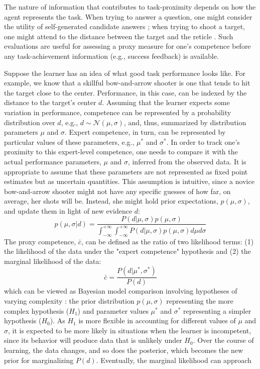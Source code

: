 The nature of information that contributes to task-proximity depends on how the agent represents the task. When trying to answer a question, one might consider the utility of self-generated candidate answers \cite{coenen_asking_2019}; when trying to shoot a target, one might attend to the distance between the target and the reticle \cite{locke_performance_2020}. Such evaluations are useful for assessing a proxy measure for one's competence before any task-achievement information (e.g., success feedback) is available.

Suppose the learner has an idea of what good task performance looks like. For example, we know that a skillful bow-and-arrow shooter is one that tends to hit the target close to the center. Performance, in this case, can be indexed by the distance to the target's center $d$. Assuming that the learner expects some variation in performance, competence can be represented by a probability distribution over $d$, e.g., $d \sim \mathcal{N}(\mu, \sigma)$, and, thus, summarized by distribution parameters $\mu$ and $\sigma$. Expert competence, in turn, can be represented by particular values of these parameters, e.g., $\mu^*$ and $\sigma^*$. In order to track one's proximity to this expert-level competence, one needs to compare it with the actual performance parameters, $\mu$ and $\sigma$, inferred from the observed data. It is appropriate to assume that these parameters are not represented as fixed point estimates but as uncertain quantities. This assumption is intuitive, since a novice bow-and-arrow shooter might not have any specific guesses of how far, on average, her shots will be. Instead, she might hold prior expectations, $p(\mu,\sigma)$, and update them in light of new evidence $d$:
\begin{equation}
    p(\mu,\sigma|d) = \frac{P(d|\mu, \sigma)p(\mu, \sigma)}{\int_{-\infty}^{+\infty}\int_{-\infty}^{+\infty}P(d|\mu,\sigma)p(\mu,\sigma)d\mu d\sigma}
\end{equation}
The proxy competence, $\bar c$, can be defined as the ratio of two likelihood terms: (1) the likelihood of the data under the "expert competence" hypothesis and (2) the marginal likelihood of the data: 
\begin{equation}
    \bar c = \frac{P(d|\mu^*,\sigma^*)}{P(d)}
\end{equation}
which can be viewed as Bayesian model comparison involving hypotheses of varying complexity \cite{griffiths_bayesian_2008}: the prior distribution $p(\mu, \sigma)$ representing the more complex hypothesis ($H_1$) and parameter values $\mu^*$ and $\sigma^*$ representing a simpler hypothesis ($H_0$). As $H_1$ is more flexible in accounting for different values of $\mu$ and $\sigma$, it is expected to be more likely in situations when the learner is incompetent, since its behavior will produce data that is unlikely under $H_0$. Over the course of learning, the data changes, and so does the posterior, which becomes the new prior for marginalizing $P(d)$. Eventually, the marginal likelihood can approach 

